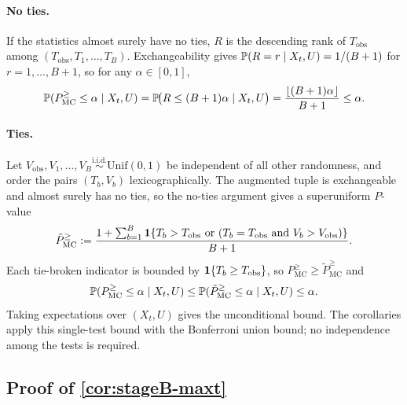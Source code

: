 \paragraph{No ties.}
If the statistics almost surely have no ties, $R$ is the descending rank of
$T_{\mathrm{obs}}$ among $(T_{\mathrm{obs}},T_1,\dots,T_B)$. Exchangeability
gives $\mathbb{P}(R = r \mid X_t,U) = 1/(B+1)$ for $r=1,\dots,B+1$, so for any
$\alpha \in [0,1]$,
%
\begin{equation}
  \mathbb{P}(P_{\mathrm{MC}}^{\ge} \le \alpha \mid X_t,U)
  = \mathbb{P}\!\big(R \le (B+1)\alpha \mid X_t,U\big)
  = \frac{\lfloor (B+1)\alpha \rfloor}{B+1}
  \le \alpha.
\end{equation}

\paragraph{Ties.}
Let $V_{\mathrm{obs}},V_1,\dots,V_B \stackrel{\mathrm{i.i.d.}}{\sim}
\mathrm{Unif}(0,1)$ be independent of all other randomness, and order the pairs
$(T_b,V_b)$ lexicographically. The augmented tuple is exchangeable and almost
surely has no ties, so the no-ties argument gives a superuniform $P$-value
%
\begin{equation}
  \tilde{P}_{\mathrm{MC}}^{\ge}
  :=
  \frac{
    1 + \sum_{b=1}^B
    \mathbf{1}\{
      T_b > T_{\mathrm{obs}}
      \text{ or } (T_b = T_{\mathrm{obs}} \text{ and } V_b > V_{\mathrm{obs}})
    \}
  }{B+1}.
\end{equation}
%
Each tie-broken indicator is bounded by $\mathbf{1}\{T_b \ge T_{\mathrm{obs}}\}$, so
$P_{\mathrm{MC}}^{\ge} \ge \tilde{P}_{\mathrm{MC}}^{\ge}$ and
%
\begin{equation}
  \mathbb{P}(P_{\mathrm{MC}}^{\ge} \le \alpha \mid X_t,U)
  \le \mathbb{P}(\tilde{P}_{\mathrm{MC}}^{\ge} \le \alpha \mid X_t,U) \le \alpha.
\end{equation}
%
Taking expectations over $(X_t,U)$ gives the unconditional bound. The
corollaries apply this single-test bound with the Bonferroni union bound; no
independence among the tests is required.

\subsection{Proof of \texorpdfstring{\cref{cor:stageB-maxt}}{Corollary 3}}
\label{app:proof-maxt}

